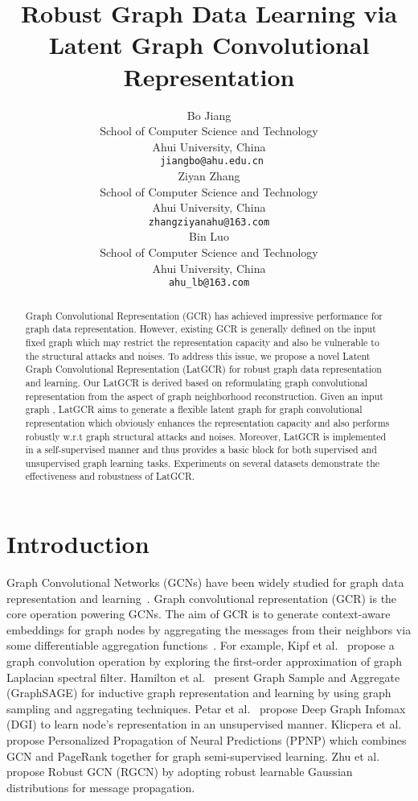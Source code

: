 \documentclass{article}
\title{Robust Graph Data Learning via Latent Graph Convolutional Representation}
\author{Bo Jiang \\
 School of Computer Science and Technology\\
 Ahui University, China\\
  \texttt{ jiangbo@ahu.edu.cn} \\
\And
  Ziyan Zhang \\
School of Computer Science and Technology\\
 Ahui University, China\\
 \texttt{zhangziyanahu@163.com} \\
  \AND
  Bin Luo \\
  School of Computer Science and Technology\\
 Ahui University, China\\
  \texttt{ahu\_lb@163.com} \\
}
\begin{document}
\maketitle

\begin{abstract}
 Graph Convolutional Representation (GCR) has achieved impressive performance for graph data representation.
However, existing GCR is generally defined on the input fixed graph which may restrict the representation capacity and also be vulnerable to the  structural attacks and noises. To address this issue, we propose a novel Latent Graph Convolutional Representation (LatGCR) for robust graph data representation and learning. Our LatGCR is derived based on reformulating graph convolutional representation from the aspect of graph neighborhood reconstruction. Given an input graph , LatGCR aims to generate a flexible latent graph  for graph convolutional representation which obviously enhances the representation capacity and also performs robustly w.r.t graph structural attacks and noises. Moreover, LatGCR is implemented in a self-supervised manner and thus provides a basic block for both supervised and unsupervised graph learning tasks.
Experiments on several  datasets demonstrate the effectiveness and robustness of LatGCR.
\end{abstract}

\section{Introduction}
Graph Convolutional Networks (GCNs) have been widely studied for graph data representation and learning~\cite{defferrard2016convolutional,kipf2016semi,velickovic2017graph,DGI,IDGL,GECN}.
Graph convolutional representation (GCR) is the core
operation powering GCNs.
The aim of GCR is to generate context-aware embeddings for graph nodes by aggregating the messages from their neighbors  via some differentiable aggregation functions~\cite{graphsage,NEURIPS2020_99e314b1}.
For example,
Kipf et al.~\cite{kipf2016semi} propose a graph convolution operation by exploring the first-order approximation of graph Laplacian spectral filter. 
Hamilton et al.~\cite{graphsage} present Graph Sample and Aggregate (GraphSAGE) for inductive graph representation and learning by using graph sampling and aggregating techniques. 
Petar et al.~\cite{DGI} propose Deep Graph Infomax (DGI) to learn node's representation in an unsupervised manner.
Klicpera et al.~\cite{APPNP} propose Personalized Propagation of Neural Predictions (PPNP) which combines GCN and PageRank together for graph semi-supervised learning.
Zhu et al.~\cite{RGCN} propose Robust GCN (RGCN) by adopting robust learnable Gaussian distributions for message propagation.
\end{document}
